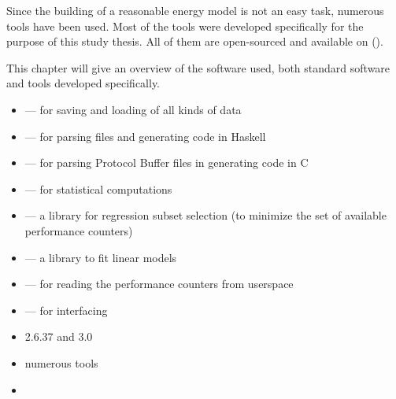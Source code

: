\label{sec:tools}

Since the building of a reasonable energy model is not an easy task, numerous
tools have been used. Most of the tools were developed specifically for the
purpose of this study thesis. All of them are open-sourced and available on
().

This chapter will give an overview of the software used, both standard software
and tools developed specifically.


\label{sec:standard-software}

\begin{itemize}

\item \JWTLprotobuf{} --- for saving and loading of all kinds of data

\item
{}
{} --- for parsing \JWTprotobuf{} files and generating
code in Haskell

\item {} ---
for parsing Protocol Buffer files in generating code in C

\item \JWTLR{} --- for statistical computations

\item {}
--- a \JWTR{} library for regression subset selection (to minimize the set of
available performance counters)

\item
{}
{} --- a \JWTR{} library to fit linear models

\item {}
{} --- for reading the performance counters from userspace

\item \JWTLnidaqmxbase{} --- for interfacing \JWPni

\item {} 2.6.37 and 3.0

\item numerous  tools

\item {}
{}

\end{itemize}


